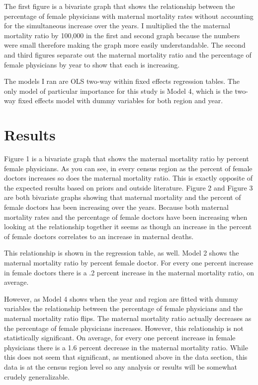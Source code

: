 \documentclass[11pt,]{article}
\begin{document}
The first figure is a bivariate graph that shows the relationship
between the percentage of female physicians with maternal mortality
rates without accounting for the simultaneous increase over the years. I
multiplied the the maternal mortality ratio by 100,000 in the first and
second graph because the numbers were small therefore making the graph
more easily understandable. The second and third figures separate out
the maternal mortality ratio and the percentage of female physicians by
year to show that each is increasing.

The models I ran are OLS two-way within fixed effects regression tables.
The only model of particular importance for this study is Model 4, which
is the two-way fixed effects model with dummy variables for both region
and year.

\section{Results}\label{results}

Figure 1 is a bivariate graph that shows the maternal mortality ratio by
percent female physicians. As you can see, in every census region as the
percent of female doctors increases so does the maternal mortality
ratio. This is exactly opposite of the expected results based on priors
and outside literature. Figure 2 and Figure 3 are both bivariate graphs
showing that maternal mortality and the percent of female doctors has
been increasing over the years. Because both maternal mortality rates
and the percentage of female doctors have been increasing when looking
at the relationship together it seems as though an increase in the
percent of female doctors correlates to an increase in maternal deaths.

This relationship is shown in the regression table, as well. Model 2
shows the maternal mortality ratio by percent female doctor. For every
one percent increase in female doctors there is a .2 percent increase in
the maternal mortality ratio, on average.

However, as Model 4 shows when the year and region are fitted with dummy
variables the relationship between the percentage of female physicians
and the maternal mortality ratio flips. The maternal mortality ratio
actually decreases as the percentage of female physicians increases.
However, this relationship is not statistically significant. On average,
for every one percent increase in female physicians there is a 1.6
percent decrease in the maternal mortality ratio. While this does not
seem that significant, as mentioned above in the data section, this data
is at the census region level so any analysis or results will be
somewhat crudely generalizable.
\end{document}
